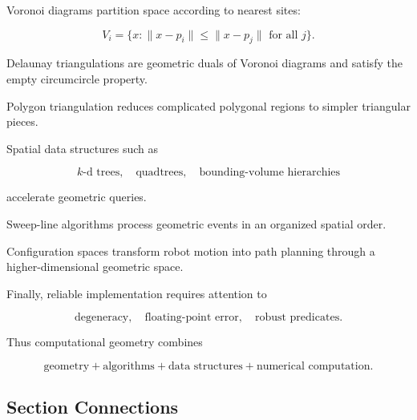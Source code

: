 Voronoi diagrams partition space according to nearest sites:

\[
\boxed{
V_i
=
\{
x:
\|x-p_i\|
\leq
\|x-p_j\|
\text{ for all }j
\}.
}
\]

Delaunay triangulations are geometric duals of Voronoi diagrams and satisfy
the empty circumcircle property.

Polygon triangulation reduces complicated polygonal regions to simpler
triangular pieces.

Spatial data structures such as

\[
\boxed{
k\text{-d trees},
\quad
\text{quadtrees},
\quad
\text{bounding-volume hierarchies}
}
\]

accelerate geometric queries.

Sweep-line algorithms process geometric events in an organized spatial
order.

Configuration spaces transform robot motion into path planning through a
higher-dimensional geometric space.

Finally, reliable implementation requires attention to

\[
\boxed{
\text{degeneracy},
\quad
\text{floating-point error},
\quad
\text{robust predicates}.
}
\]

Thus computational geometry combines

\[
\boxed{
\text{geometry}
+
\text{algorithms}
+
\text{data structures}
+
\text{numerical computation}.
}
\]

\subsection{Section Connections}
\label{subsec:computational-geometry-connections}


